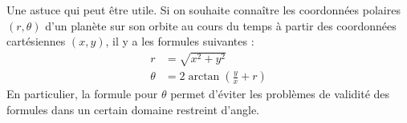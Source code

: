 \bigskip

Une astuce qui peut être utile. Si on souhaite connaître les coordonnées polaires $(r,\theta)$ d'un planète sur son orbite au cours du temps à partir des coordonnées cartésiennes $(x,y)$, il y a les formules suivantes : 
\begin{subequations}
\begin{align}
r &= \sqrt{x^2 + y^2}\\
\theta &= 2 \arctan\left(\frac{y}{x} + r\right)
\end{align}
\end{subequations}
En particulier, la formule pour $\theta$ permet d'éviter les problèmes de validité des formules dans un certain domaine restreint d'angle. 